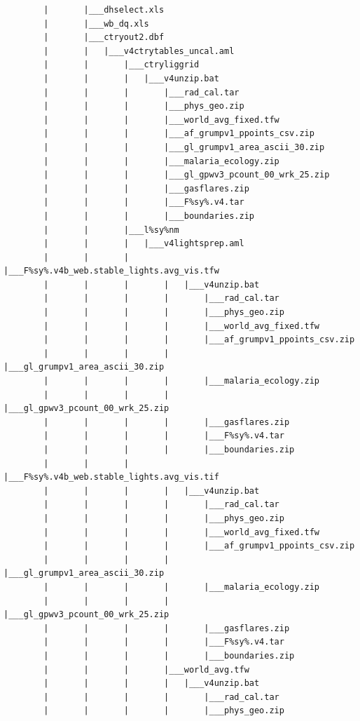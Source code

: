 \documentclass[]{book}
\begin{document}
\begin{verbatim}
        |       |___dhselect.xls
        |       |___wb_dq.xls
        |       |___ctryout2.dbf
        |       |   |___v4ctrytables_uncal.aml
        |       |       |___ctryliggrid
        |       |       |   |___v4unzip.bat
        |       |       |       |___rad_cal.tar
        |       |       |       |___phys_geo.zip
        |       |       |       |___world_avg_fixed.tfw
        |       |       |       |___af_grumpv1_ppoints_csv.zip
        |       |       |       |___gl_grumpv1_area_ascii_30.zip
        |       |       |       |___malaria_ecology.zip
        |       |       |       |___gl_gpwv3_pcount_00_wrk_25.zip
        |       |       |       |___gasflares.zip
        |       |       |       |___F%sy%.v4.tar
        |       |       |       |___boundaries.zip
        |       |       |___l%sy%nm
        |       |       |   |___v4lightsprep.aml
        |       |       |       |___F%sy%.v4b_web.stable_lights.avg_vis.tfw
        |       |       |       |   |___v4unzip.bat
        |       |       |       |       |___rad_cal.tar
        |       |       |       |       |___phys_geo.zip
        |       |       |       |       |___world_avg_fixed.tfw
        |       |       |       |       |___af_grumpv1_ppoints_csv.zip
        |       |       |       |       |___gl_grumpv1_area_ascii_30.zip
        |       |       |       |       |___malaria_ecology.zip
        |       |       |       |       |___gl_gpwv3_pcount_00_wrk_25.zip
        |       |       |       |       |___gasflares.zip
        |       |       |       |       |___F%sy%.v4.tar
        |       |       |       |       |___boundaries.zip
        |       |       |       |___F%sy%.v4b_web.stable_lights.avg_vis.tif
        |       |       |       |   |___v4unzip.bat
        |       |       |       |       |___rad_cal.tar
        |       |       |       |       |___phys_geo.zip
        |       |       |       |       |___world_avg_fixed.tfw
        |       |       |       |       |___af_grumpv1_ppoints_csv.zip
        |       |       |       |       |___gl_grumpv1_area_ascii_30.zip
        |       |       |       |       |___malaria_ecology.zip
        |       |       |       |       |___gl_gpwv3_pcount_00_wrk_25.zip
        |       |       |       |       |___gasflares.zip
        |       |       |       |       |___F%sy%.v4.tar
        |       |       |       |       |___boundaries.zip
        |       |       |       |___world_avg.tfw
        |       |       |       |   |___v4unzip.bat
        |       |       |       |       |___rad_cal.tar
        |       |       |       |       |___phys_geo.zip

\end{verbatim}
\end{document}
